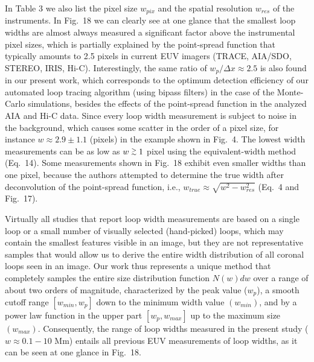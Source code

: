 \documentclass[10pt,preprint]{aastex}  %
\def\gapprox{\lower.4ex\hbox{$\;\buildrel >\over{\scriptstyle\sim}\;$}}
\begin{document}
In Table 3 we also list the pixel size $w_{pix}$ and the spatial
resolution $w_{res}$ of the instruments. In Fig.~18 we can clearly
see at one glance that the smallest loop widths are almost always
measured a significant factor above the instrumental pixel sizes,
which is partially explained by the point-spread function that
typically amounts to 2.5 pixels in current EUV imagers (TRACE,
AIA/SDO, STEREO, IRIS, Hi-C). Interestingly, the same ratio
of $w_p/\Delta x \approx 2.5$ is also found in our present work,
which corresponds to the optimum detection efficiency of our
automated loop tracing algorithm (using bipass filters)
in the case of the Monte-Carlo simulations, besides the effects
of the point-spread function in the analyzed AIA and Hi-C data. 
Since every loop width measurement
is subject to noise in the background, which causes some scatter
in the order of a pixel size, for instance $w \approx 2.9\pm1.1$  
(pixels) in the example shown in Fig.~4. The lowest width measurements
can be as low as $w \gapprox 1$ pixel using the equivalent-width
method (Eq.~14). Some measurements shown in Fig.~18 exhibit even
smaller widths than one pixel, because the authors attempted to
determine the true width after deconvolution of the point-spread
function, i.e., $w_{true} \approx \sqrt{w^2 - w_{res}^2}$ (Eq.~4 
and Fig.~17).
 
Virtually all studies that report loop width measurements 
are based on a single loop or a small number of visually selected
(hand-picked) loops, which may contain the smallest features
visible in an image, but they are not representative samples
that would allow us to derive the entire width distribution 
of all coronal loops seen in an image. Our work thus represents
a unique method that completely samples the entire size distribution
function $N(w) dw$ over a range of about two orders of magnitude,
characterized by the peak value ($w_p$), a smooth cutoff range
$[w_{min}, w_p]$ down to the minimum width value 
$(w_{min})$, and by a power law function
in the upper part $[w_p, w_{max}]$ up to the maximum size 
$(w_{max})$. Consequently, the range of loop widths measured
in the present study ($w \approx 0.1-10$ Mm) entails all previous
EUV measurements of loop widths, as it can be seen at one
glance in Fig.~18. 
\end{document}
